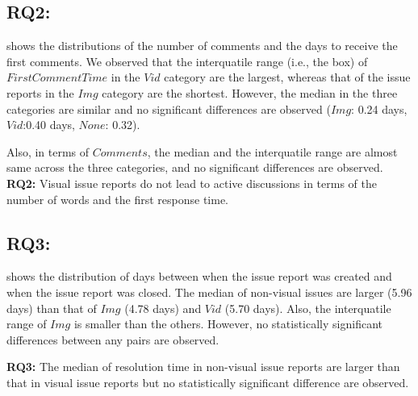 \subsection*{RQ2: \RQtwo{}}


 shows the distributions of the number of comments and the days to receive the first comments. 
We observed that the interquatile range (i.e., the box) of $FirstCommentTime$ in the $Vid$ category are the largest, whereas that of the issue reports in the $Img$ category are the shortest. 
However, the median in the three categories are similar and no significant differences are observed ($Img$: 0.24 days, $Vid$:0.40 days, $None$: 0.32). 

Also, in terms of $Comments$, the median and the interquatile range are almost same across the three categories, and no significant differences are observed. 
\summarybox
{{\bf RQ2: }{
    Visual issue reports do not lead to active discussions in terms of the number of words and the first response time. 
}}
\subsection*{RQ3: \RQthree{}}
 shows the distribution of days between when the issue report was created and when the issue report was closed. The median of non-visual issues are larger (5.96 days) than that of $Img$ (4.78 days) and $Vid$ (5.70 days). Also, the interquatile range of $Img$ is smaller than the others. However, no statistically significant differences between any pairs are observed.  

\summarybox
{{\bf RQ3: }{
The median of resolution time in non-visual issue reports are larger than that in visual issue reports but no statistically significant difference are observed. 
}}




